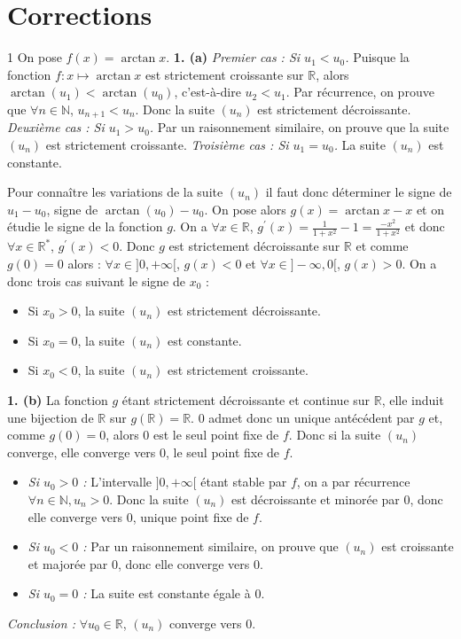 \newpage
\section{Corrections}

\begin{correction}{1}
On pose $f(x)=\arctan x$.
\textbf{1. (a)}
\textit{Premier cas : Si $u_{1}<u_{0}$.}
Puisque la fonction $f:x\mapsto \arctan x$ est strictement croissante sur $\mathbb{R}$, alors $\arctan(u_{1})<\arctan(u_{0})$, c'est-à-dire $u_{2}<u_{1}$.
Par récurrence, on prouve que $\forall n\in\mathbb{N}$, $u_{n+1}<u_{n}$. Donc la suite $(u_{n})$ est strictement décroissante.
\textit{Deuxième cas : Si $u_{1}>u_{0}$.}
Par un raisonnement similaire, on prouve que la suite $(u_{n})$ est strictement croissante.
\textit{Troisième cas : Si $u_{1}=u_{0}$.}
La suite $(u_{n})$ est constante.

Pour connaître les variations de la suite $(u_{n})$ il faut donc déterminer le signe de $u_{1}-u_{0}$, signe de $\arctan(u_{0})-u_{0}$.
On pose alors $g(x)=\arctan x - x$ et on étudie le signe de la fonction $g$.
On a $\forall x\in\mathbb{R}$, $g^{\prime}(x)=\frac{1}{1+x^{2}} - 1 = \frac{-x^{2}}{1+x^{2}}$ et donc $\forall x\in\mathbb{R}^{*}$, $g^{\prime}(x)<0$.
Donc $g$ est strictement décroissante sur $\mathbb{R}$ et comme $g(0)=0$ alors :
$\forall x\in]0,+\infty[$, $g(x)<0$ et $\forall x\in]-\infty,0[$, $g(x)>0$.
On a donc trois cas suivant le signe de $x_{0}$ :
\begin{itemize}
    \item Si $x_{0}>0$, la suite $(u_{n})$ est strictement décroissante.
    \item Si $x_{0}=0$, la suite $(u_{n})$ est constante.
    \item Si $x_{0}<0$, la suite $(u_{n})$ est strictement croissante.
\end{itemize}

\textbf{1. (b)} La fonction $g$ étant strictement décroissante et continue sur $\mathbb{R}$, elle induit une bijection de $\mathbb{R}$ sur $g(\mathbb{R})=\mathbb{R}$.
$0$ admet donc un unique antécédent par $g$ et, comme $g(0)=0$, alors 0 est le seul point fixe de $f$.
Donc si la suite $(u_{n})$ converge, elle converge vers 0, le seul point fixe de $f$.
\begin{itemize}
    \item \textit{Si $u_{0}>0$ :} L'intervalle $]0,+\infty[$ étant stable par $f$, on a par récurrence $\forall n\in\mathbb{N}, u_{n}>0$. Donc la suite $(u_{n})$ est décroissante et minorée par 0, donc elle converge vers 0, unique point fixe de $f$.
    \item \textit{Si $u_{0}<0$ :} Par un raisonnement similaire, on prouve que $(u_{n})$ est croissante et majorée par 0, donc elle converge vers 0.
    \item \textit{Si $u_{0}=0$ :} La suite est constante égale à 0.
\end{itemize}
\textit{Conclusion :} $\forall u_{0}\in\mathbb{R}$, $(u_{n})$ converge vers 0.


\end{correction}
